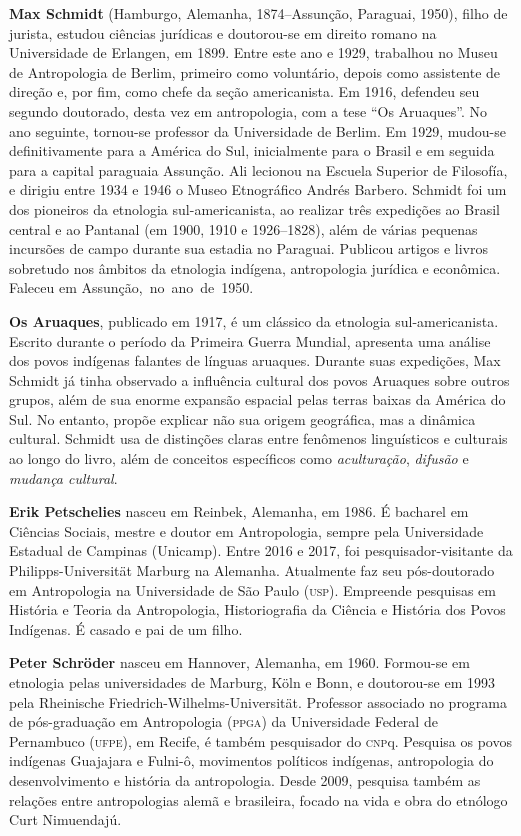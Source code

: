 \textbf{Max Schmidt} (Hamburgo, Alemanha, 1874--Assunção, Paraguai, 1950), filho de jurista, estudou ciências jurídicas e doutorou-se em direito romano na Universidade de Erlangen, em 1899. Entre este ano e 1929, trabalhou no Museu de Antropologia de Berlim, primeiro como voluntário, depois como assistente de direção e, por fim, como chefe da seção americanista. Em 1916, defendeu seu segundo doutorado, desta vez em antropologia, com a tese ``Os Aruaques''. No ano seguinte, tornou-se professor da Universidade de Berlim. Em 1929, mudou-se definitivamente para a América do Sul, inicialmente para o Brasil e em seguida para a capital paraguaia Assunção. Ali lecionou na Escuela Superior de Filosofía, e dirigiu entre 1934 e 1946 o Museo Etnográfico Andrés Barbero. Schmidt foi um dos pioneiros da etnologia sul-americanista, ao realizar três expedições ao Brasil central e ao Pantanal (em 1900, 1910 e 1926--1828), além de várias pequenas incursões de campo durante sua estadia no Paraguai. Publicou artigos e livros sobretudo nos âmbitos da etnologia indígena, antropologia jurídica e econômica. Faleceu em Assunção,~no~ano~de~1950.

\textbf{Os Aruaques}, publicado em 1917, é um clássico da etnologia sul-americanista. Escrito durante o período da Primeira Guerra Mundial, apresenta uma análise dos povos indígenas falantes de línguas aruaques. Durante suas expedições, Max Schmidt já tinha observado a influência cultural dos povos Aruaques sobre outros grupos, além de sua enorme expansão espacial pelas terras baixas da América do Sul. No entanto, propõe explicar não sua origem geográfica, mas a dinâmica cultural. Schmidt usa de distinções claras entre fenômenos linguísticos e culturais ao longo do livro, além de conceitos específicos como \textit{aculturação}, \textit{difusão} e \textit{mudança cultural}.

\pagebreak
\thispagestyle{empty}

\textbf{Erik Petschelies} nasceu em Reinbek, Alemanha, em 1986. É bacharel em Ciências Sociais, mestre e doutor em Antropologia, sempre pela Universidade Estadual de Campinas (Unicamp). Entre 2016 e 2017, foi pesquisador-visitante da Philipps-Universität Marburg na Alemanha. Atualmente faz seu pós-doutorado em Antropologia na Universidade de São Paulo (\textsc{usp}). Empreende pesquisas em História e Teoria da Antropologia, Historiografia da Ciência e História dos Povos Indígenas. É casado e pai de um filho.

\textbf{Peter Schröder} nasceu em Hannover, Alemanha, em 1960. Formou-se em etnologia pelas universidades de Marburg, Köln e Bonn, e doutorou-se em 1993 pela Rheinische Friedrich-Wilhelms-Universität. Professor associado no programa de pós-graduação em Antropologia (\textsc{ppga}) da Universidade Federal de Pernambuco (\textsc{ufpe}), em Recife, é também pesquisador do \textsc{cnp}q. Pesquisa os povos indígenas Guajajara e Fulni-ô, movimentos políticos indígenas, antropologia do desenvolvimento e história da antropologia. Desde 2009, pesquisa também as relações entre antropologias alemã e brasileira, focado na vida e obra do etnólogo Curt Nimuendajú.

